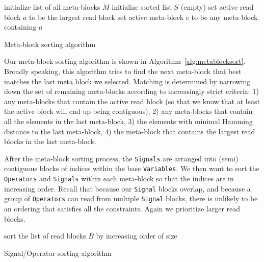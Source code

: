 \documentclass{article}
\begin{document}

\begin{algorithm}
\DontPrintSemicolon
initialize list of all meta-blocks $M$\;
initialize sorted list $S$ (empty)\;
set active read block $a$ to be the largest read block\;
set active meta-block $c$ to be any meta-block containing $a$\;
\caption{Meta-block sorting algorithm}
\label{alg:metablocksort}
\end{algorithm}

Our meta-block sorting algorithm is shown in Algorithm~\ref{alg:metablocksort}.  Broadly speaking, this algorithm tries to find the next meta-block that best matches the last meta block we selected.  Matching is determined by narrowing down the set of remaining meta-blocks according to increasingly strict criteria: 1) any meta-blocks that contain the active read block (so that we know that at least the active block will end up being contiguous), 2) any meta-blocks that contain all the elements in the last meta-block, 3) the elements with minimal Hamming distance to the last meta-block, 4) the meta-block that contains the largest read blocks in the last meta-block.

After the meta-block sorting process, the \texttt{Signals} are arranged into (semi) contiguous blocks of indices within the base \texttt{Variables}.  We then want to sort the \texttt{Operators} and \texttt{Signals} within each meta-block so that the indices are in increasing order.  Recall that because our \texttt{Signal} blocks overlap, and because a group of \texttt{Operators} can read from multiple \texttt{Signal} blocks, there is unlikely to be an ordering that satisfies all the constraints.  Again we prioritize larger read blocks.

\begin{algorithm}
\DontPrintSemicolon
sort the list of read blocks $B$ by increasing order of size\;
\caption{Signal/Operator sorting algorithm}
\label{alg:sigopsort}
\end{algorithm}
\end{document}
